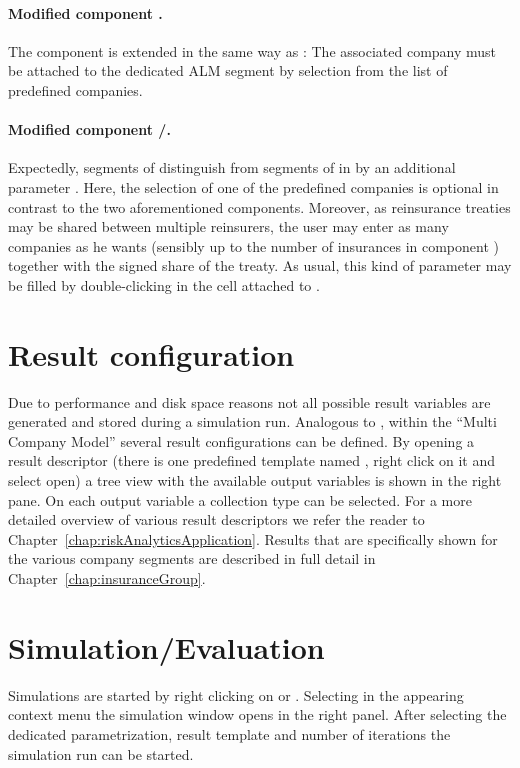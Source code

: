 \paragraph{Modified component .}
The component  is extended in the same way as :
The associated company must be attached to the dedicated ALM segment by selection from the list of predefined companies.

\paragraph{Modified component /.}
Expectedly, segments of  distinguish from segments of  in \PODRA{} by an additional parameter . Here, the selection of one of the predefined companies is optional in contrast to the two aforementioned components. Moreover,
 as reinsurance treaties may be shared between multiple reinsurers, the user may enter as many companies as he wants (sensibly up to the number of insurances in component ) together with the signed share of the treaty. As usual, this kind of parameter may be filled by double-clicking in the cell attached to .

\section*{Result configuration}
Due to performance and disk space reasons not all possible result variables are generated and stored during a simulation run. Analogous to \PODRA{}, within the ``Multi Company Model'' several result configurations can be defined. By opening a result descriptor
(there is one predefined template named  , right click on it and select open) a tree view with the available output variables is shown in the right pane. On each output variable a collection type can be selected. For a more detailed overview of various result descriptors we refer the reader to Chapter~\ref{chap:riskAnalyticsApplication}. Results that are specifically shown for the various company segments are described in full detail in Chapter~\ref{chap:insuranceGroup}.


\section*{Simulation/Evaluation}
Simulations are started by right clicking on  or . Selecting  in the appearing context menu the simulation window opens in the right panel. After selecting the dedicated parametrization, result template and number of iterations the simulation run can be started.

